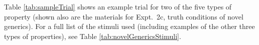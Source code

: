 \documentclass[10pt,letterpaper]{article}
\begin{document}
 
Table \ref{tab:sampleTrial} shows an example trial for two of the five types of property (shown also are the materials for Expt.~2c, truth conditions of novel generics).
For a full list of the stimuli used (including examples of the other three types of properties), see Table \ref{tab:novelGenericsStimuli}.
\end{document}
